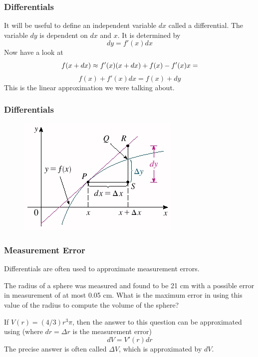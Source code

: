 \documentclass[xcolor=dvipsnames]{beamer}
\begin{document}
\begin{frame}
  \frametitle{Differentials}
It will be useful to define an independent variable $dx$ called a
\alert{differential}. The variable $dy$ is dependent on $dx$ and $x$.
It is determined by
\begin{equation}
  \label{eq:ahngieng}
  dy=f'(x)dx
\end{equation}
Now have a look at
\begin{equation}
  \label{eq:uzeepahv}
  f(x+dx)\approx{}f'(x)(x+dx)+f(x)-f'(x)x=\notag
\end{equation}
\begin{equation}
  \label{eq:ahghuako}
  f(x)+f'(x)dx=f(x)+dy
\end{equation}
This is the linear approximation we were talking about. 
\end{frame}

\begin{frame}
  \frametitle{Differentials}
\begin{figure}[h]
\includegraphics[scale=3]{./diagrams/differentials.jpg}
\end{figure}
\end{frame}

\begin{frame}
  \frametitle{Measurement Error}
Differentials are often used to approximate measurement errors. 

\bigskip

\label{ex:ootiteij} The radius of a
sphere was measured and found to be 21 cm with a possible error in
measurement of at most 0.05 cm. What is the maximum error in using
this value of the radius to compute the volume of the sphere?

\bigskip

If $V(r)=(4/3)r^{3}\pi$, then the answer to this question can be
approximated using (where $dr=\Delta{}r$ is the measurement error)
\begin{equation}
  \label{eq:faeshiur}
  dV=V'(r)dr
\end{equation}
The precise answer is often called $\Delta{}V$, which is approximated
by $dV$.
\end{frame}
\end{document}
